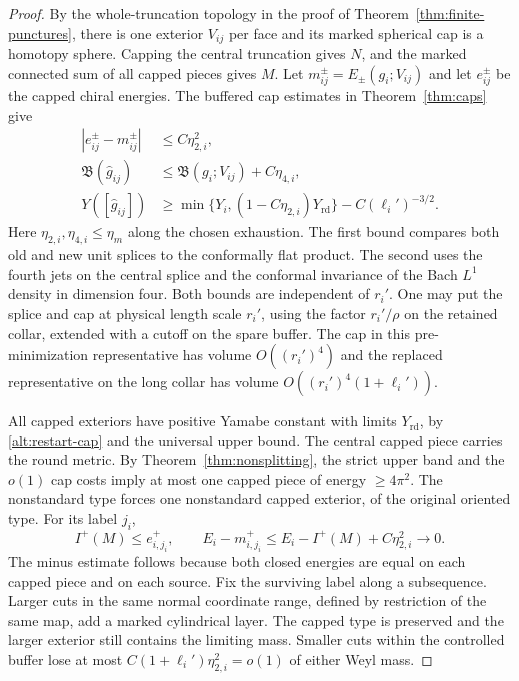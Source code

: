 \begin{proof}
By the whole-truncation topology in the proof of
Theorem~\ref{thm:finite-punctures}, there is one exterior \(V_{ij}\)
per face and its marked spherical cap is a homotopy sphere.
Capping the central truncation gives \(N\), and the marked
connected sum of all capped pieces gives \(M\).
Let \(m^\pm_{ij}=E_\pm(g_i;V_{ij})\) and let \(e^\pm_{ij}\)
be the capped chiral energies. The buffered cap estimates in
Theorem~\ref{thm:caps} give
\begin{equation}\label{alt:restart-cap}
 \begin{split}
 |e^\pm_{ij}-m^\pm_{ij}|&\le C\eta_{2,i}^2,\\
 \mathfrak B(\widehat g_{ij})&\le
         \mathfrak B(g_i;V_{ij})+C\eta_{4,i},\\
 Y([\widehat g_{ij}])&\ge
   \min\{Y_i,(1-C\eta_{2,i})Y_{\mathrm{rd}}\}
        -C(\ell_i')^{-3/2}.
 \end{split}
\end{equation}
Here \(\eta_{2,i},\eta_{4,i}\le\eta_m\) along the chosen
exhaustion. The first bound compares both old and new unit splices
to the conformally flat product. The second uses the fourth jets
on the central splice and the conformal invariance of the Bach
\(L^1\) density in dimension four. Both bounds are independent of
\(r_i'\). One may put the splice and cap at physical length
scale \(r_i'\), using the factor \(r_i'/\rho\) on the retained
collar, extended with a cutoff on the spare buffer. The cap in this
pre-minimization representative has volume \(O((r_i')^4)\)
and the replaced representative on the long collar has volume
\(O((r_i')^4(1+\ell_i'))\).

All capped exteriors have positive Yamabe constant with limits
\(Y_{\mathrm{rd}}\), by \eqref{alt:restart-cap} and the universal
upper bound. The central capped piece carries the round metric.
By Theorem~\ref{thm:nonsplitting}, the strict upper band and the
\(o(1)\) cap costs imply at most one capped piece of energy
\(\ge4\pi^2\). The nonstandard type forces one nonstandard
capped exterior, of the original oriented type. For its label
\(j_i\),
\[
 I^+(M)\le e^+_{i,j_i},\qquad
 E_i-m^+_{i,j_i}\le E_i-I^+(M)+C\eta_{2,i}^2\to0 .
\]
The minus estimate follows because both closed energies are equal
on each capped piece and on each source. Fix the surviving label
along a subsequence. Larger cuts in the same normal coordinate
range, defined by restriction of the same map, add a marked
cylindrical layer. The capped type is preserved and the larger
exterior still contains the limiting mass. Smaller cuts within
the controlled buffer lose at most
\(C(1+\ell_i')\eta_{2,i}^2=o(1)\) of either Weyl mass.


\end{proof}
